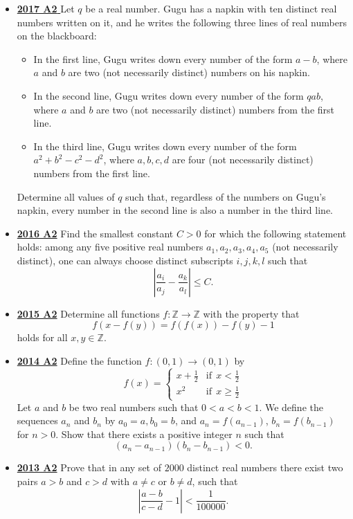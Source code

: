 \documentclass[11pt]{scrartcl}
\begin{document}
\begin{itemize}[leftmargin=*]
\item \href{https://artofproblemsolving.com/community/c6h1671307p10632422}{\textbf{2017 A2} }	Let $q$ be a real number. Gugu has a napkin with ten distinct real numbers written on it, and he writes the following three lines of real numbers on the blackboard:
\begin{itemize}[leftmargin=*]
    \item[$\bullet$]  In the first line, Gugu writes down every number of the form $a-b$, where $a$ and $b$ are two (not necessarily distinct) numbers on his napkin.
\item[$\bullet$]In the second line, Gugu writes down every number of the form $qab$, where $a$ and $b$ are
two (not necessarily distinct) numbers from the first line.
\item[$\bullet$] In the third line, Gugu writes down every number of the form $a^2+b^2-c^2-d^2$, where $a, b, c, d$ are four (not necessarily distinct) numbers from the first line.
\end{itemize}
Determine all values of $q$ such that, regardless of the numbers on Gugu's napkin, every number in the second line is also a number in the third line.
\item \href{https://artofproblemsolving.com/community/c6h1480705p8639281}{\textbf{2016 A2}} Find the smallest constant $C > 0$ for which the following statement holds: among any five positive real numbers $a_1,a_2,a_3,a_4,a_5$ (not necessarily distinct), one can always choose distinct subscripts $i,j,k,l$ such that
\[ \left| \frac{a_i}{a_j} - \frac {a_k}{a_l} \right| \leqslant C. \]
\item \href{https://artofproblemsolving.com/community/c6h1268817p6621849}{\textbf{2015 A2}} Determine all functions $f:\mathbb{Z}\rightarrow\mathbb{Z}$ with the property that\[f(x-f(y))=f(f(x))-f(y)-1\]holds for all $x,y\in\mathbb{Z}$.
\item \href{https://artofproblemsolving.com/community/c6h1113206p5083585}{\textbf{2014 A2}} Define the function $f:(0,1)\to (0,1)$ by\[\displaystyle f(x) = \left\{ \begin{array}{lr} x+\frac 12 & \text{if}\ \  x < \frac 12\\ x^2 & \text{if}\ \  x \geqslant \frac 12 \end{array} \right.\]Let $a$ and $b$ be two real numbers such that $0 < a < b < 1$. We define the sequences $a_n$ and $b_n$ by $a_0 = a, b_0 = b$, and $a_n = f( a_{n -1})$, $b_n = f (b_{n -1} )$ for $n > 0$. Show that there exists a positive integer $n$ such that\[(a_n - a_{n-1})(b_n-b_{n-1})<0.\]
\item \href{https://artofproblemsolving.com/community/c6h597119p3543341}{\textbf{2013 A2}} Prove that in any set of $2000$ distinct real numbers there exist two pairs $a>b$ and $c>d$ with $a \neq c$ or $b \neq d $, such that\[ \left| \frac{a-b}{c-d} - 1 \right|< \frac{1}{100000}. \]
\newpage


\end{itemize}
\end{document}
